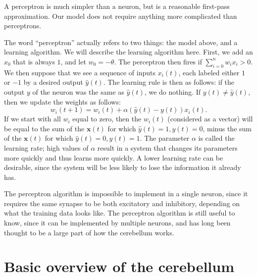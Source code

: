 \documentclass{article}
\theoremstyle{definition}
\begin{document}
A perceptron is much simpler than a neuron, but is a reasonable
first-pass approximation. Our model does not require anything more
complicated than perceptrons.

The word ``perceptron'' actually refers to two things: the model
above, and a learning algorithm. We will describe the learning
algorithm here. First, we add an $x_0$ that is always $1$, and let
$w_0 = - \theta$. The perceptron then fires if $\sum_{i=0}^n w_i x_i >
0$. We then suppose that we see a sequence of inputs $x_i(t)$, each
labeled either $1$ or $-1$ by a desired output $\widehat{y}(t)$. The
learning rule is then as follows: if the output $y$ of the neuron was
the same as $\widehat{y}(t)$, we do nothing. If $y(t) \ne
\widehat{y}(t)$, then we update the weights as follows:
$$w_i(t+1) = w_i(t) + \alpha (\widehat{y}(t) - y(t)) x_i(t).$$ If we
start with all $w_i$ equal to zero, then the $w_i(t)$ (considered as a
vector) will be equal to the sum of the $\mathbf{x}(t)$ for which
$\widehat{y}(t)=1,y(t)=0$, minus the sum of the $\mathbf{x}(t)$ for
which $\widehat{y}(t)=0, y(t)=1$. The parameter $\alpha$ is called
the learning rate; high values of $\alpha$ result in a system that
changes its parameters more quickly and thus learns more quickly. A
lower learning rate can be desirable, since the system will be less
likely to lose the information it already has.

The perceptron algorithm is impossible to implement in a single
neuron, since it requires the same synapse to be both excitatory and
inhibitory, depending on what the training data looks like. The
perceptron algorithm is still useful to know, since it can be
implemented by multiple neurons, and has long been thought to be a
large part of how the cerebellum works.


\section{Basic overview of the cerebellum}
\end{document}
